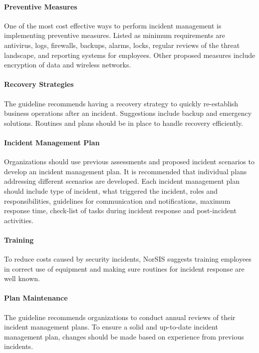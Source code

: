 \paragraph{Preventive Measures}
One of the most cost effective ways to perform incident management is implementing preventive measures. Listed as minimum requirements are antivirus, logs, firewalls, backups, alarms, locks, regular reviews of the threat landscape, and reporting systems for employees. Other proposed measures include encryption of data and wireless networks.   

\paragraph{Recovery Strategies}
The guideline recommends having a recovery strategy to quickly re-establish business operations after an incident. Suggestions include backup and emergency solutions. Routines and plans should be in place to handle recovery efficiently.

\paragraph{Incident Management Plan}
Organizations should use previous assessments and proposed incident scenarios to develop an incident management plan. It is recommended that individual plans addressing different scenarios are developed. Each incident management plan should include type of incident, what triggered the incident, roles and responsibilities, guidelines for communication and notifications, maximum response time, check-list of tasks during incident response and post-incident activities.

\paragraph{Training}
To reduce costs caused by security incidents, NorSIS suggests training employees in correct use of equipment and making sure routines for incident response are well known.

\paragraph{Plan Maintenance}
The guideline recommends organizations to conduct annual reviews of their incident management plans. To ensure a solid and up-to-date incident management plan, changes should be made based on experience from previous incidents. 

